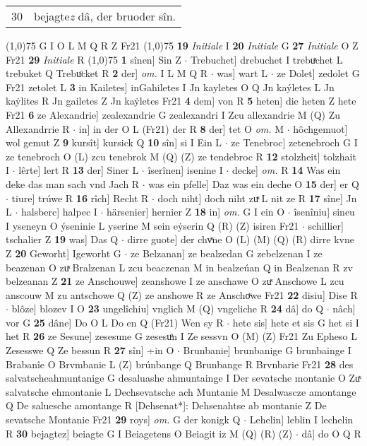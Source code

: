 \documentclass[8pt,a4paper,notitlepage]{article}
\begin{document}
\begin{table}[ht]
\begin{minipage}[t]{0.5\linewidth}
\begin{tabular}{rl}
30 & bejagte\textit{z} dâ, der bruoder sîn.\\ 
\end{tabular}
\scriptsize
\line(1,0){75} \newline
G I O L M Q R Z Fr21 \newline
\line(1,0){75} \newline
\textbf{19} \textit{Initiale} I  \textbf{20} \textit{Initiale} G  \textbf{27} \textit{Initiale} O Z Fr21  \textbf{29} \textit{Initiale} R  \newline
\line(1,0){75} \newline
\textbf{1} sînen] Sin Z  $\cdot$ Trebuchet] drebuchet I trebuͯchet L trebuket Q Trebuͦcket R \textbf{2} der] \textit{om.} I L M Q R  $\cdot$ was] wart L  $\cdot$ ze Dolet] zedolet G Fr21 zetolet L \textbf{3} in Kailetes] inGahiletes I Jn kayletes O Q Jn kaýletes L Jn kaẏlites R Jn gailetes Z Jn kaẏletes Fr21 \textbf{4} dem] von R \textbf{5} heten] die heten Z hete Fr21 \textbf{6} ze Alexandrie] zealexandrie G zealexandri I Zcu allexandrie M (Q) Zu Allexandrrie R  $\cdot$ in] in der O L (Fr21) der R \textbf{8} der] tet O \textit{om.} M  $\cdot$ hôchgemuot] wol gemut Z \textbf{9} kursît] kursick Q \textbf{10} sîn] si I Ein L  $\cdot$ ze Tenebroc] zetenebroch G I ze tenebroch O (L) zcu tenebrok M (Q) (Z) ze tendebroc R \textbf{12} stolzheit] tolzhait I  $\cdot$ lêrte] lert R \textbf{13} der] Siner L  $\cdot$ îserînen] isenine I  $\cdot$ decke] \textit{om.} R \textbf{14} Was ein deke das man sach vnd Jach R  $\cdot$ was ein pfelle] Daz was ein deche O \textbf{15} der] er Q  $\cdot$ tiure] trúwe R \textbf{16} rîch] Recht R  $\cdot$ doch niht] doch niht zuͯ L nit ze R \textbf{17} sîne] Jn L  $\cdot$ halsberc] halpec I  $\cdot$ härsenier] hernier Z \textbf{18} in] \textit{om.} G I ein O  $\cdot$ îsenîniu] sineu I yseneyn O ýseninie L yserine M sein eẏserin Q (R) (Z) isiren Fr21  $\cdot$ schillier] tschalier Z \textbf{19} was] Das Q  $\cdot$ dirre guote] der chvͦne O (L) (M) (Q) (R) dirre kvne Z \textbf{20} Geworht] Igeworht G  $\cdot$ ze Belzanan] ze bealzedan G zebelzenan I ze beazenan O zuͯ Bralzenan L zcu beaczenan M in bealzeúan Q in Bealzenan R zv belzeanan Z \textbf{21} ze Anschouwe] zeanshowe I ze anschawe O zuͯ Anschowe L zcu anscouw M zu antschowe Q (Z) ze anshowe R ze Anschoͮwe Fr21 \textbf{22} disiu] Dise R  $\cdot$ blôze] blozev I O \textbf{23} ungelîchiu] vnglich M (Q) vngeliche R \textbf{24} dâ] do Q  $\cdot$ nâch] vor G \textbf{25} dâne] Do O L Do en Q (Fr21) Wen sy R  $\cdot$ hete sis] hete et sis G het si I het R \textbf{26} ze Sesune] zesesune G zesesuͦn I Ze sessvn O (M) (Z) Fr21 Zu Epheso L Zesesswe Q Ze bessun R \textbf{27} sîn] ÷in O  $\cdot$ Brunbanie] brunbanige G brunbainge I Brabanîe O Brvmbanie L (Z) brúnbange Q Brunbange R Brvnbarie Fr21 \textbf{28} des salvatscheahmuntanige G desaluashe ahmuntainge I Der sevatsche montanie O Zuͯ salvatsche ehmontanie L Dechsevatsche ach Muntanie M Desalwascze amontange Q De saluesche amontange R [Dehsenat*]: Dehsenahtse ab montanie Z De sevatsche Montanie Fr21 \textbf{29} roys] \textit{om.} G der konigk Q  $\cdot$ Lehelin] leblin I lechelin R \textbf{30} bejagtez] beiagte G I Beiagetens O Beiagit iz M (Q) (R) (Z)  $\cdot$ dâ] do O Q R \newline

\end{minipage}
\end{table}
\end{document}
